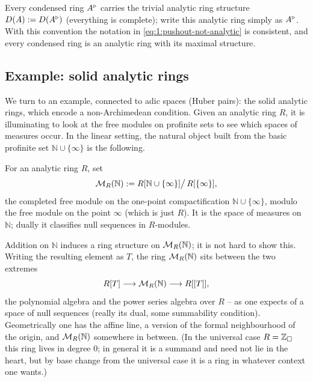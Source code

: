 \begin{remark}
\label{rmk:1:trivial-structure}
Every condensed ring $A^{\triangleright}$ carries the trivial analytic ring structure
$D(A):=D(A^{\triangleright})$ (everything is complete); write this analytic ring simply as
$A^{\triangleright}$. With this convention the notation in \eqref{eq:1:pushout-not-analytic}
is consistent, and every condensed ring is an analytic ring with its maximal
structure.
\end{remark}

\subsection{Example: solid analytic rings}

We turn to an example, connected to adic spaces (Huber pairs): the solid analytic
rings, which encode a non-Archimedean condition. Given an analytic ring $R$, it
is illuminating to look at the free modules on profinite sets to see which spaces
of measures occur. In the linear setting, the natural object built from the basic
profinite set $\mathbb{N}\cup\{\infty\}$ is the following.

\begin{definition}
\label{def:1:measures-on-N}
For an analytic ring $R$, set
\begin{equation*}
\mathcal{M}_R(\mathbb{N}):=R[\mathbb{N}\cup\{\infty\}]\big/\,R[\{\infty\}],
\end{equation*}
the completed free module on the one-point compactification
$\mathbb{N}\cup\{\infty\}$, modulo the free module on the point $\infty$ (which is
just $R$). It is the space of measures on $\mathbb{N}$; dually it classifies null
sequences in $R$-modules.
\end{definition}

\begin{remark}
\label{rmk:1:MRN-ring}
Addition on $\mathbb{N}$ induces a ring structure on $\mathcal{M}_R(\mathbb{N})$; it is
not hard to show this. Writing the resulting element as $T$, the ring
$\mathcal{M}_R(\mathbb{N})$ sits between the two extremes
\begin{equation}
\label{eq:1:MRN-between}
R[T]\longrightarrow \mathcal{M}_R(\mathbb{N})\longrightarrow R[[T]],
\end{equation}
the polynomial algebra and the power series algebra over $R$ -- as one expects
of a space of null sequences (really its dual, some summability condition).
Geometrically one has the affine line, a version of the formal neighbourhood of
the origin, and $\mathcal{M}_R(\mathbb{N})$ somewhere in between. (In the universal
case $R=\mathbb{Z}_{\square}$ this ring lives in degree $0$; in general it is a summand and
need not lie in the heart, but by base change from the universal case it is a
ring in whatever context one wants.)
\end{remark}

